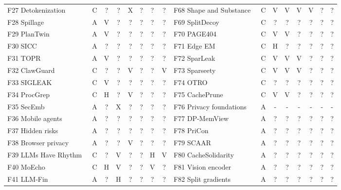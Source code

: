 \begin{table}[t]
\begin{tabularx}{\textwidth}{@{}Yccccccc@{\hspace{9pt}}Yccccccc@{}}
F27 Detokenization~\cite{weiss2026detokenization} & C & ? & ? & X & ? & ? & ? & F68 Shape and Substance~\cite{hadad2026shape} & C & V & V & V & V & ? & ?\\
F28 Spillage~\cite{roh2026spillage} & A & V & ? & ? & ? & ? & ? & F69 SplitDecoy~\cite{politis2026splitdecoy} & C & ? & ? & ? & ? & ? & ?\\
F29 PlanTwin~\cite{yu2026plantwin} & A & V & ? & ? & ? & ? & ? & F70 PAGE404~\cite{nazaraliyev2026page404} & C & V & V & ? & ? & ? & ?\\
F30 SICC~\cite{xu2026sicc} & A & ? & ? & ? & ? & ? & ? & F71 Edge EM~\cite{alhalawani2026physicaledge} & C & H & ? & ? & ? & ? & ?\\
F31 TOPR~\cite{qiao2026topr} & A & V & ? & ? & ? & ? & ? & F72 SparLeak~\cite{chen2026sparleak} & C & V & V & V & ? & ? & ?\\
F32 ClawGuard~\cite{gan2026clawguard} & C & ? & ? & V & ? & ? & V & F73 Sparseety~\cite{jo2026sparseety} & C & V & V & V & ? & ? & ?\\
F33 SIGLEAK~\cite{geng2026sigleak} & C & V & ? & ? & ? & ? & ? & F74 OTRO~\cite{lee2026otro} & C & ? & ? & ? & ? & ? & ?\\
F34 ProcGrep~\cite{oderinwale2026procgrep} & C & H & ? & V & ? & ? & ? & F75 CachePrune~\cite{wu2026cacheprune} & C & V & V & ? & ? & ? & ?\\
F35 SecEmb~\cite{umar2025secemb} & A & ? & X & ? & ? & ? & ? & F76 Privacy foundations~\cite{kotevska2026privacyfoundations} & A & - & - & - & - & - & -\\
F36 Mobile agents~\cite{wu2025mobileagents} & A & ? & ? & ? & ? & ? & ? & F77 DP-MemView~\cite{dpmemview2026} & A & ? & ? & ? & ? & ? & ?\\
F37 Hidden risks~\cite{mudryi2025hidden} & A & ? & ? & ? & ? & ? & ? & F78 PriCon~\cite{pricon2026} & A & ? & ? & ? & ? & ? & ?\\
F38 Browser privacy~\cite{ukani2025browserprivacy} & A & ? & ? & V & ? & ? & ? & F79 SCAAR~\cite{mondol2025scaar} & A & ? & ? & ? & ? & ? & ?\\
F39 LLMs Have Rhythm~\cite{alhazbi2025rhythm} & C & ? & V & ? & ? & H & V & F80 CacheSolidarity~\cite{pennas2026cachesolidarity} & A & ? & ? & ? & ? & ? & ?\\
F40 MoEcho~\cite{ding2025moecho} & C & H & V & ? & ? & V & ? & F81 Vision encoder~\cite{zhou2026visionencoder} & A & ? & ? & ? & ? & ? & ?\\
F41 LLM-Fin~\cite{nazari2024llmfin} & A & ? & H & ? & ? & ? & ? & F82 Split gradients~\cite{politis2026gradients} & A & ? & ? & ? & ? & ? & ?\\
\bottomrule\end{tabularx}
\end{table}
